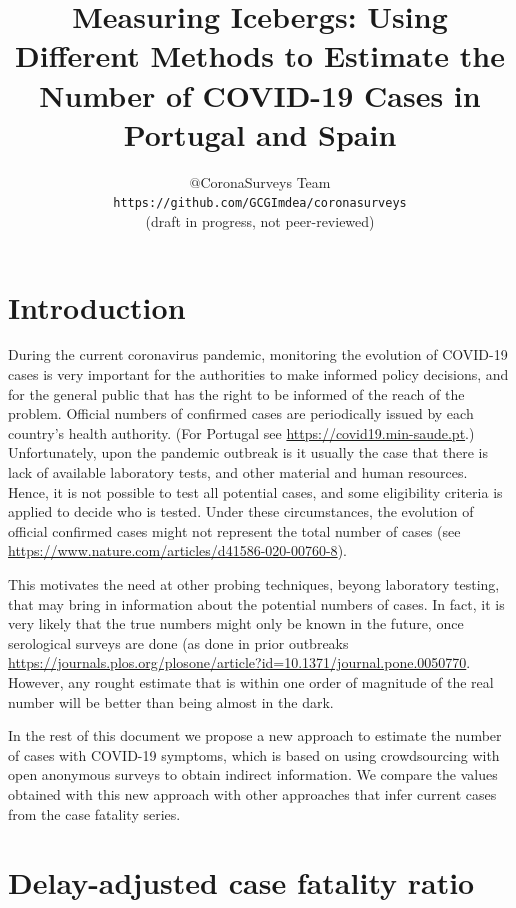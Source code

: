 \documentclass{article}
\begin{document}
\title{Measuring Icebergs: Using Different Methods to Estimate the Number of COVID-19 Cases in Portugal and Spain}
\author{$@$CoronaSurveys Team \\ \texttt{https://github.com/GCGImdea/coronasurveys}\\(draft in progress, not peer-reviewed)}
\maketitle
\section{Introduction}

During the current coronavirus pandemic, monitoring the evolution of COVID-19 cases is very important for the authorities to make
informed policy decisions, and for the general public that has the right to be informed of the reach of the problem. 
Official numbers of confirmed cases are periodically issued by each country's health authority. (For Portugal see \url{https://covid19.min-saude.pt}.)
Unfortunately, upon the pandemic outbreak is it usually the case that there is lack of available laboratory tests, and other material and human resources. Hence, it is not possible to test all potential cases, and some eligibility criteria is applied to decide who is tested.
Under these circumstances, the evolution of official confirmed cases might not represent the total number of cases (see \url{https://www.nature.com/articles/d41586-020-00760-8}).  

This motivates the need at other probing techniques, beyong laboratory testing, that may bring in information about the potential numbers of cases. In fact, it is very likely that the true numbers might only be known in the future, once serological surveys are done (as done in prior outbreaks \url{https://journals.plos.org/plosone/article?id=10.1371/journal.pone.0050770}. However, any rought estimate that is within one order of magnitude of the real number will be better than being almost in the dark.

In the rest of this document we propose a new approach to estimate the number of cases with COVID-19 symptoms, which is based on using crowdsourcing with open anonymous surveys to obtain indirect information. We compare the values obtained with this new approach with other approaches that infer current cases from the case fatality series.

\section{Delay-adjusted case fatality ratio}
\end{document}

